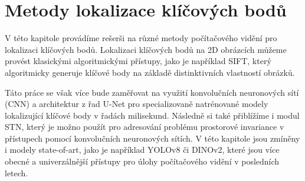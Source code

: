\chapter{Metody lokalizace klíčových bodů}
\label{sec:Chapter2}
V této kapitole provádíme rešerši na různé metody počítačového vidění pro lokalizaci klíčových bodů. Lokalizaci klíčových bodů na 2D obrázcích můžeme provést klasickými algoritmickými přístupy, jako je například SIFT, který algoritmicky generuje klíčové body na základě distinktivních vlastností obrázků. 

Táto práce se však více bude zaměřovat na využití konvolučních neuronových sítí (CNN) a architektur z řad U-Net pro specializovaně natrénované modely lokalizující klíčové body v řadách milisekund. Následně si také přiblížíme i modul STN, který je možno použít pro adresování problému prostorové invariance v přístupech pomocí konvolučních neuronových sítích. V této kapitole jsou zmíněny i modely state-of-art, jako je například YOLOv8 či DINOv2, které jsou více obecné a univerzálnější přístupy pro úlohy počítačového vidění v posledních letech.
\endinput